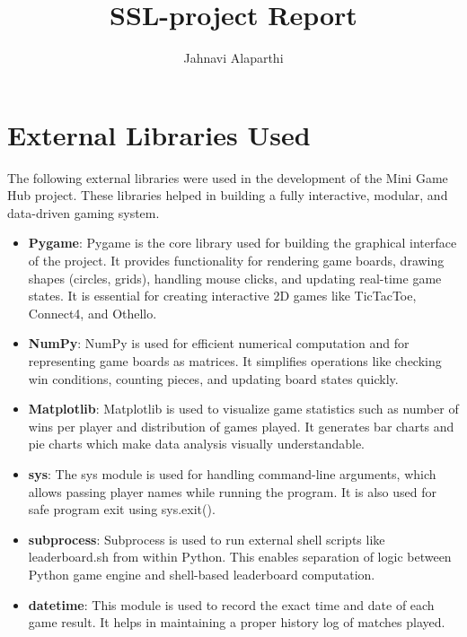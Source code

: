 \documentclass[12pt]{article}
\title{SSL-project Report}
\author{Jahnavi Alaparthi}
\begin{document}
\maketitle

\section{External Libraries Used}

The following external libraries were used in the development of the Mini Game Hub project. These libraries helped in building a fully interactive, modular, and data-driven gaming system.

\begin{itemize}

\item \textbf{Pygame}:  
Pygame is the core library used for building the graphical interface of the project. It provides functionality for rendering game boards, drawing shapes (circles, grids), handling mouse clicks, and updating real-time game states. It is essential for creating interactive 2D games like TicTacToe, Connect4, and Othello.

\item \textbf{NumPy}:  
NumPy is used for efficient numerical computation and for representing game boards as matrices. It simplifies operations like checking win conditions, counting pieces, and updating board states quickly.

\item \textbf{Matplotlib}:  
Matplotlib is used to visualize game statistics such as number of wins per player and distribution of games played. It generates bar charts and pie charts which make data analysis visually understandable.

\item \textbf{sys}:  
The sys module is used for handling command-line arguments, which allows passing player names while running the program. It is also used for safe program exit using sys.exit().

\item \textbf{subprocess}:  
Subprocess is used to run external shell scripts like leaderboard.sh from within Python. This enables separation of logic between Python game engine and shell-based leaderboard computation.

\item \textbf{datetime}:  
This module is used to record the exact time and date of each game result. It helps in maintaining a proper history log of matches played.


\end{itemize}
\end{document}
